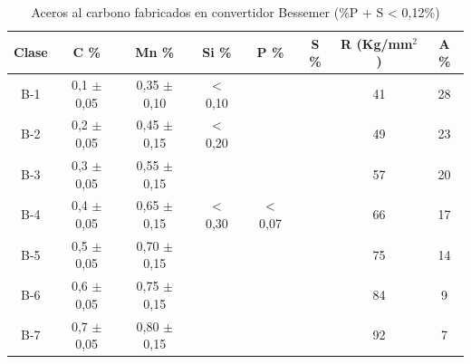 \documentclass[12pt,a4paper]{article}
\begin{document}
\begin{table}[h]
    \centering
    \begin{tabular}{cccccccc}
    \toprule
    \textbf{Clase} & \textbf{C \%} & \textbf{Mn \%} & \textbf{Si \%} & \textbf{P \%} & \textbf{S \%} & \textbf{R (Kg/mm$^2$)} & \textbf{A \%} \\
    \midrule
    B-1 & 0,1 $\pm$ 0,05 & 0,35 $\pm$ 0,10 & $<$ 0,10 &               &               & 41 & 28 \\
    B-2 & 0,2 $\pm$ 0,05 & 0,45 $\pm$ 0,15 & $<$ 0,20 &               &               & 49 & 23 \\
    B-3 & 0,3 $\pm$ 0,05 & 0,55 $\pm$ 0,15 &           &               &               & 57 & 20 \\
    B-4 & 0,4 $\pm$ 0,05 & 0,65 $\pm$ 0,15 & $<$ 0,30 & $<$ 0,07      &               & 66 & 17 \\
    B-5 & 0,5 $\pm$ 0,05 & 0,70 $\pm$ 0,15 &           &               &               & 75 & 14 \\
    B-6 & 0,6 $\pm$ 0,05 & 0,75 $\pm$ 0,15 &           &               &               & 84 &  9 \\
    B-7 & 0,7 $\pm$ 0,05 & 0,80 $\pm$ 0,15 &           &               &               & 92 &  7 \\
    \bottomrule
    \end{tabular}
    \caption{Aceros al carbono fabricados en convertidor Bessemer (\%P + S < 0,12\%)}
    \label{tab:AceBessemer}
\end{table}
\end{document}
